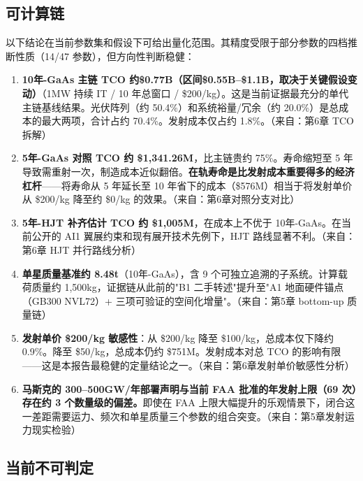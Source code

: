 \subsection{可计算链}

以下结论在当前参数集和假设下可给出量化范围。其精度受限于部分参数的四档推断性质（14/47 参数），但方向性判断稳健：

\begin{enumerate}[leftmargin=*]
    \item \textbf{10年-GaAs 主链 TCO 约\$0.77B（区间\$0.55B--\$1.1B，取决于关键假设变动）}（1\;MW 持续 IT / 10 年总窗口 / \$200/kg）。这是当前证据最充分的单代主链基线结果。光伏阵列（约 50.4\%）和系统裕量/冗余（约 20.0\%）是总成本的最大两项，合计占约 70.4\%。发射成本仅占约 1.8\%。（来自：第6章 TCO 拆解）

    \item \textbf{5年-GaAs 对照 TCO 约 \$1,341.26M}，比主链贵约 75\%。寿命缩短至 5 年导致需重射一次，制造成本近似翻倍。\textbf{在轨寿命是比发射成本重要得多的经济杠杆}——将寿命从 5 年延长至 10 年省下的成本（\$576M）相当于将发射单价从 \$200/kg 降至约 \$0/kg 的效果。（来自：第6章对照分支对比）

    \item \textbf{5年-HJT 补齐估计 TCO 约 \$1,005M}，在成本上不优于 10年-GaAs。在当前公开的 AI1 翼展约束和现有展开技术先例下，HJT 路线显著不利。（来自：第6章 HJT 并行路线分析）

    \item \textbf{单星质量基准约 8.48\;t}（10年-GaAs），含 9 个可独立追溯的子系统。计算载荷质量约 1,500\;kg，证据链从此前的"B1 二手转述"提升至"A1 地面硬件锚点（GB300 NVL72）+ 三项可验证的空间化增量"。（来自：第5章 bottom-up 质量链）

    \item \textbf{发射单价 \$200/kg 敏感性}：从 \$200/kg 降至 \$100/kg，总成本仅下降约 0.9\%。降至 \$50/kg，总成本仍约 \$751M。发射成本对总 TCO 的影响有限——这是本报告最稳健的定量结论之一。（来自：第6章发射单价敏感性分析）

    \item \textbf{马斯克的 300--500\;GW/年部署声明与当前 FAA 批准的年发射上限（69 次）存在约 3 个数量级的偏差。}即使在 FAA 上限大幅提升的乐观情景下，闭合这一差距需要运力、频次和单星质量三个参数的组合突变。（来自：第5章发射运力现实检验）
\end{enumerate}

\subsection{当前不可判定}

